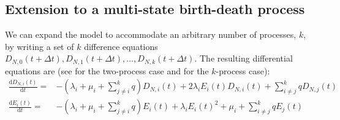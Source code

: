 \subsection{Extension to a multi-state birth-death process}
We can expand the \BiSSE model to accommodate an arbitrary number of processes, $k$, by writing a set of $k$ difference equations $D_{N,0}(t+\Delta t), D_{N,1}(t+\Delta t), \ldots, D_{N,k}(t+\Delta t)$.
The resulting differential equations are (see \cite{Maddison2007} for the two-process case and \cite{FitzJohn2010} for the $k$-process case):
\begin{align*}
	\frac{\mathrm{d}D_{N,i}(t)}{\mathrm{d}t} = & - \left(\lambda_i + \mu_i + \sum\limits_{j \neq i}^k q\right)D_{N,i}(t) + 2\lambda_iE_i(t)D_{N,i}(t) + \sum\limits_{i \neq j}^k q D_{N,j}(t) \\
   	\frac{\mathrm{d}E_i(t)}{\mathrm{d}t} = & - \left(\lambda_i + \mu_i + \sum\limits_{j \neq i}^k q \right)E_i(t) + \lambda_iE_i(t)^2 + \mu_i + \sum\limits_{i \neq j}^k q E_j(t)
\end{align*}

